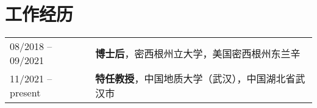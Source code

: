\section*{工作经历}
\begin{tabular}{p{} p{}}
08/2018 -- 09/2021 & \textbf{博士后}，密西根州立大学，美国密西根州东兰辛 \\
11/2021 -- present & \textbf{特任教授}，中国地质大学（武汉），中国湖北省武汉市 \\
\end{tabular}
